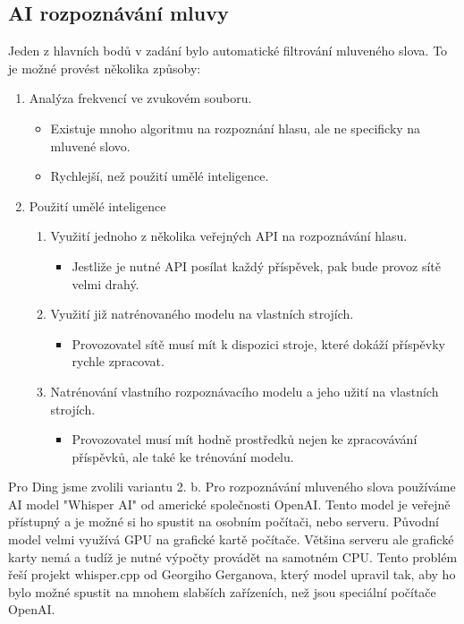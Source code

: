 \subsection{AI rozpoznávání mluvy}

Jeden z hlavních bodů v zadání bylo automatické filtrování mluveného slova. To je možné provést několika
způsoby:

\begin{enumerate}
    \item Analýza frekvencí ve zvukovém souboru.
        \begin{itemize}
            \item Existuje mnoho algoritmu na rozpoznání hlasu, ale ne specificky na mluvené slovo.
            \item Rychlejší, než použití umělé inteligence.
        \end{itemize}
    \item Použití umělé inteligence
        \begin{enumerate}
            \item Využití jednoho z několika veřejných API na rozpoznávání hlasu.
                \begin{itemize}
                    \item Jestliže je nutné API posílat každý příspěvek, pak bude provoz sítě velmi drahý.
                \end{itemize}
            \item Využití již natrénovaného modelu na vlastních strojích.
                \begin{itemize}
                    \item Provozovatel sítě musí mít k dispozici stroje, které dokáží příspěvky rychle zpracovat.
                \end{itemize}
            \item Natrénování vlastního rozpoznávacího modelu a jeho užití na vlastních strojích.
                \begin{itemize}
                    \item Provozovatel musí mít hodně prostředků nejen ke zpracovávání příspěvků, ale také ke trénování modelu.
                \end{itemize}
        \end{enumerate}
\end{enumerate}

Pro Ding jsme zvolili variantu 2. b. Pro rozpoznávání mluveného slova používáme AI model "Whisper AI" od americké
společnosti OpenAI\cite{openai-whisper}. Tento model je veřejně přístupný a je možné si ho spustit na osobním počítači, nebo serveru.
Původní model velmi využívá GPU na grafické kartě počítače. Většina serveru ale grafické karty nemá a tudíž je
nutné výpočty provádět na samotném CPU. Tento problém řeší projekt whisper.cpp od Georgiho Gerganova, který model upravil
tak, aby ho bylo možné spustit na mnohem slabších zařízeních, než jsou speciální počítače OpenAI.

